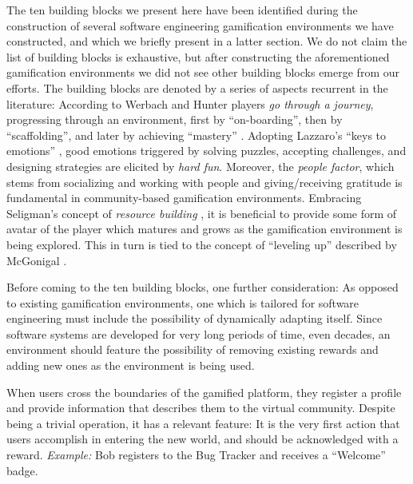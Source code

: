 The ten building blocks we present here have been identified during the construction of several software engineering gamification environments we have constructed, and which we briefly present in a latter section.
We do not claim the list of building blocks is exhaustive, but after constructing the aforementioned gamification environments we did not see other building blocks emerge from our efforts.
The building blocks are denoted by a series of aspects recurrent in the literature: According to Werbach and Hunter players {\em go through a journey}, progressing through an environment, first by ``on-boarding'', then by ``scaffolding'', and later by achieving ``mastery'' \cite{Werb2012a}.
Adopting Lazzaro's ``keys to emotions'' \cite{Lazzaro2004}, good emotions triggered by solving puzzles, accepting challenges, and designing strategies are elicited by {\em hard fun}.
Moreover, the {\em people factor}, which stems from socializing and working with people and giving/receiving gratitude is fundamental in community-based gamification environments.
Embracing Seligman's concept of {\em resource building} \cite{seligman2000positive}, it is beneficial to provide some form of avatar of the player which matures and grows as the gamification environment is being explored.
This in turn is tied to the concept of ``leveling up'' described by McGonigal \cite{McGo2011a}.

Before coming to the ten building blocks, one further consideration: As opposed to existing gamification environments, one which is tailored for software engineering must include the possibility of dynamically adapting itself.
Since software systems are developed for very long periods of time, even decades, an environment should feature the possibility of removing existing rewards and adding new ones as the environment is being used.

 When users cross the boundaries of the gamified platform, they register a profile and provide information that describes them to the virtual community.
Despite being a trivial operation, it has a relevant feature: It is the very first action that users accomplish in entering the new world, and should be acknowledged with a reward.
{\em Example:} Bob registers to the Bug Tracker and receives a ``Welcome'' badge.

